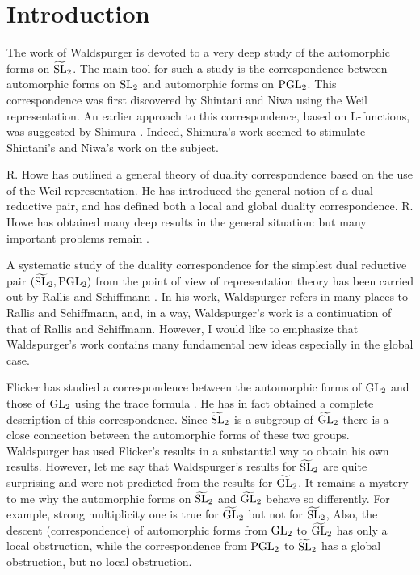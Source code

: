 \section{Introduction}
\label{sec:0}

The work of Waldspurger \cite{waldspurger78theta,waldspurger80shimura,waldspurger81demientier,waldspurger84shimura,waldspurger91quaternion} is devoted to a very deep study of the automorphic forms on $\widetilde{\mathrm{SL}}_2$.
The main tool for such a study is the correspondence between automorphic forms on $\mathrm{SL}_2$ and automorphic forms on $\mathrm{PGL}_2$.
This correspondence was first discovered by Shintani and Niwa using the Weil representation.
An earlier approach to this correspondence, based on L-functions, was suggested by Shimura \cite{shimura73half}.
Indeed, Shimura's work seemed to stimulate Shintani's and Niwa's work on the subject.

R. Howe has outlined a general theory of duality correspondence based on the use of the Weil representation. 
He has introduced the general notion of a dual reductive pair, and has defined both a local and global duality correspondence.
R. Howe has obtained many deep results in the general situation: but many important problems remain \cite{howe79theta}.

A systematic study of the duality correspondence for the simplest dual reductive pair $(\widetilde{\mathrm{SL}}_2, \mathrm{PGL}_2)$ from the point of view of representation theory has been carried out by Rallis and Schiffmann \cite{rs77metaplectic}.
In his work, Waldspurger refers in many places to Rallis and Schiffmann, and, in a way, Waldspurger's work is a continuation of that of Rallis and Schiffmann.
However, I would like to emphasize that Waldspurger's work contains many fundamental new ideas especially in the global case.

Flicker has studied a correspondence between the automorphic forms of $\mathrm{GL}_2$ and those of $\mathrm{GL}_2$ using the trace formula \cite{flicker80covering}.
He has in fact obtained a complete description of this correspondence.
Since $\widetilde{\mathrm{SL}}_2$ is a subgroup of $\widetilde{\mathrm{GL}}_2$ there is a close connection between the automorphic forms of these two groups.
Waldspurger has used Flicker's results in a substantial way to obtain his own results.
However, let
me say that Waldspurger's results for $\widetilde{\mathrm{SL}}_2$ are quite surprising and were not predicted from the results for $\widetilde{\mathrm{GL}}_2$.
It remains a mystery to me why the automorphic forms on $\widetilde{\mathrm{SL}}_2$ and $\widetilde{\mathrm{GL}}_2$ behave so differently.
For example, strong multiplicity one is true for $\widetilde{\mathrm{GL}}_2$ but not for $\widetilde{\mathrm{SL}}_2$,
Also, the descent (correspondence) of automorphic forms from $\mathrm{GL}_2$ to $\widetilde{\mathrm{GL}}_2$ has only a local obstruction, while the correspondence from $\mathrm{PGL}_2$ to $\widetilde{\mathrm{SL}}_2$ has a global obstruction, but no local obstruction.

